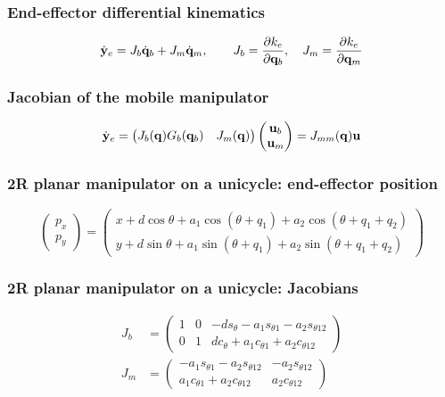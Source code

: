 \subsubsection{End-effector differential kinematics}
\begin{equation*}
    {\dot{\mathbf y}}_e=J_b{\dot{\mathbf q}}_b+J_m{\dot{\mathbf q}}_m,\qquad J_b=\frac{\partial k_e}{\partial{\mathbf q}_b},\quad J_m=\frac{\partial k_e}{\partial{\mathbf q}_m}
\end{equation*}

\subsubsection{Jacobian of the mobile manipulator}
\begin{equation*}
    {\dot{\mathbf y}}_e=\begin{pmatrix}J_b({\mathbf q})G_b({\mathbf q}_b)&J_m({\mathbf q})\end{pmatrix}\begin{pmatrix}\mathbf u_b\\\mathbf u_m\end{pmatrix}=J_{mm}({\mathbf q})\mathbf u
\end{equation*}

\subsubsection{2R planar manipulator on a unicycle: end-effector position}
\begin{equation*}
    \begin{pmatrix}p_x\\p_y\end{pmatrix}=\begin{pmatrix}x+d\cos\theta+a_1\cos(\theta+q_1)+a_2\cos(\theta+q_1+q_2)\\y+d\sin\theta+a_1\sin(\theta+q_1)+a_2\sin(\theta+q_1+q_2)\end{pmatrix}
\end{equation*}

\subsubsection{2R planar manipulator on a unicycle: Jacobians}
\begin{align*}
    J_b&=\begin{pmatrix}1&0&-ds_\theta-a_1s_{\theta1}-a_2s_{\theta12}\\0&1&dc_\theta+a_1c_{\theta1}+a_2c_{\theta12}\end{pmatrix}\\
    J_m&=\begin{pmatrix}-a_1s_{\theta1}-a_2s_{\theta12}&-a_2s_{\theta12}\\a_1c_{\theta1}+a_2c_{\theta12}&a_2c_{\theta12}\end{pmatrix}
\end{align*}

